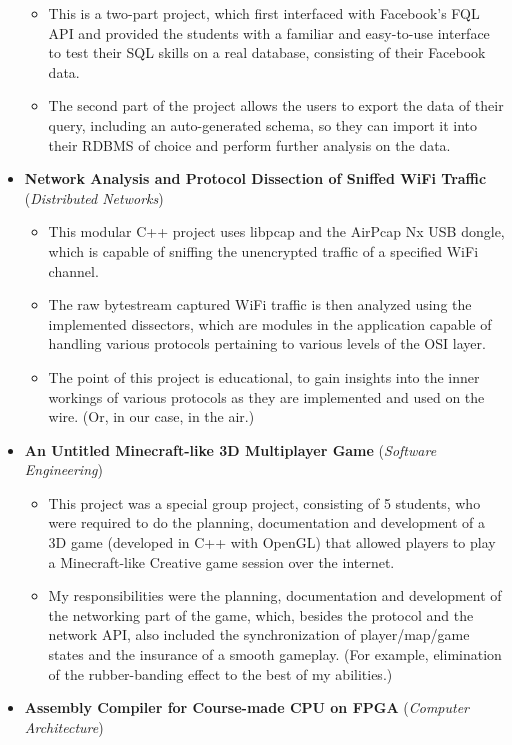 \documentclass[12pt,a4paper]{article}
\begin{document}
\begin{itemize}
		\begin{itemize}
		\item	This is a two-part project, which first interfaced with Facebook's FQL API and provided the students with a familiar and easy-to-use interface to test their SQL skills on a real database, consisting of their Facebook data.
		\item	The second part of the project allows the users to export the data of their query, including an auto-generated schema, so they can import it into their RDBMS of choice and perform further analysis on the data.
		\end{itemize}
	\item	\textbf{Network Analysis and Protocol Dissection of Sniffed WiFi Traffic} (\textit{Distributed Networks})
		\begin{itemize}
		\item	This modular C++ project uses libpcap and the AirPcap Nx USB dongle, which is capable of sniffing the unencrypted traffic of a specified WiFi channel.
		\item	The raw bytestream captured WiFi traffic is then analyzed using the implemented dissectors, which are modules in the application capable of handling various protocols pertaining to various levels of the OSI layer.
		\item	The point of this project is educational, to gain insights into the inner workings of various protocols as they are implemented and used on the wire. (Or, in our case, in the air.)
		\end{itemize}
	\item	\textbf{An Untitled Minecraft-like 3D Multiplayer Game} (\textit{Software Engineering})
		\begin{itemize}
		\item	This project was a special group project, consisting of 5 students, who were required to do the planning, documentation and development of a 3D game (developed in C++ with OpenGL) that allowed players to play a Minecraft-like Creative game session over the internet.
		\item	My responsibilities were the planning, documentation and development of the networking part of the game, which, besides the protocol and the network API, also included the synchronization of player/map/game states and the insurance of a smooth gameplay. (For example, elimination of the rubber-banding effect to the best of my abilities.)
		\end{itemize}
	\item	\textbf{Assembly Compiler for Course-made CPU on FPGA} (\textit{Computer Architecture})

\end{itemize}
\end{document}
